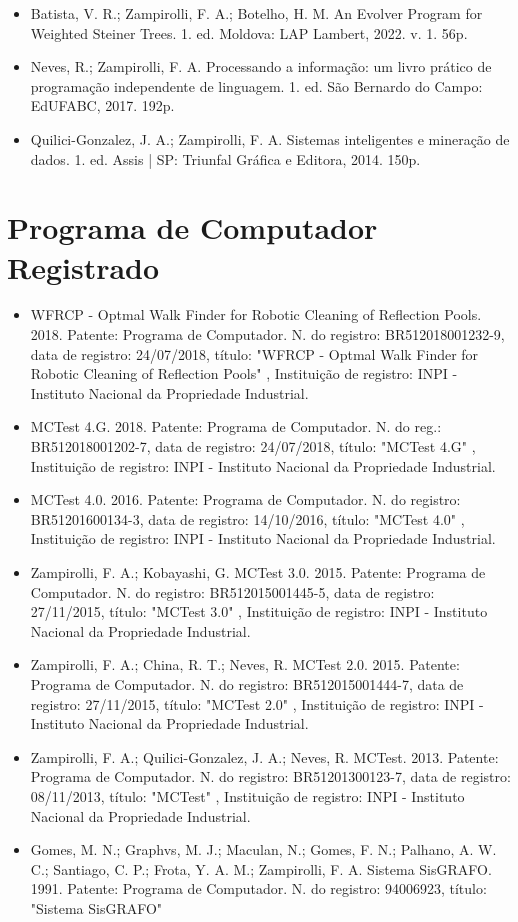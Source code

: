 \begin{itemize}
    \item Batista, V. R.; Zampirolli, F. A.; Botelho, H. M. An Evolver Program for Weighted Steiner Trees. 1. ed. Moldova: LAP Lambert, 2022. v. 1. 56p.
    \item Neves, R.; Zampirolli, F. A. Processando a informação: um livro prático de programação independente de linguagem. 1. ed. São Bernardo do Campo: EdUFABC, 2017. 192p.
    \item Quilici-Gonzalez, J. A.; Zampirolli, F. A. Sistemas inteligentes e mineração de dados. 1. ed. Assis | SP: Triunfal Gráfica e Editora, 2014. 150p.
\end{itemize}

\section{Programa de Computador Registrado}

\begin{itemize}
    \item WFRCP - Optmal Walk Finder for Robotic Cleaning of Reflection Pools. 2018. Patente: Programa de Computador. N. do registro: BR512018001232-9, data de registro: 24/07/2018, título: "WFRCP - Optmal Walk Finder for Robotic Cleaning of Reflection Pools" , Instituição de registro: INPI - Instituto Nacional da Propriedade Industrial.
    \item MCTest 4.G. 2018. Patente: Programa de Computador. N. do reg.: BR512018001202-7, data de registro: 24/07/2018, título: "MCTest 4.G" , Instituição de registro: INPI - Instituto Nacional da Propriedade Industrial.
    \item MCTest 4.0. 2016. Patente: Programa de Computador. N. do registro: BR51201600134-3, data de registro: 14/10/2016, título: "MCTest 4.0" , Instituição de registro: INPI - Instituto Nacional da Propriedade Industrial.
    \item Zampirolli, F. A.; Kobayashi, G. MCTest 3.0. 2015. Patente: Programa de Computador. N. do registro: BR512015001445-5, data de registro: 27/11/2015, título: "MCTest 3.0" , Instituição de registro: INPI - Instituto Nacional da Propriedade Industrial.
    \item Zampirolli, F. A.; China, R. T.; Neves, R. MCTest 2.0. 2015. Patente: Programa de Computador. N. do registro: BR512015001444-7, data de registro: 27/11/2015, título: "MCTest 2.0" , Instituição de registro: INPI - Instituto Nacional da Propriedade Industrial.
    \item Zampirolli, F. A.; Quilici-Gonzalez, J. A.; Neves, R. MCTest. 2013. Patente: Programa de Computador. N. do registro: BR51201300123-7, data de registro: 08/11/2013, título: "MCTest" , Instituição de registro: INPI - Instituto Nacional da Propriedade Industrial.
    \item Gomes, M. N.; Graphvs, M. J.; Maculan, N.; Gomes, F. N.; Palhano, A. W. C.; Santiago, C. P.; Frota, Y. A. M.; Zampirolli, F. A. Sistema SisGRAFO. 1991. Patente: Programa de Computador. N. do registro: 94006923, título: "Sistema SisGRAFO"
\end{itemize}


